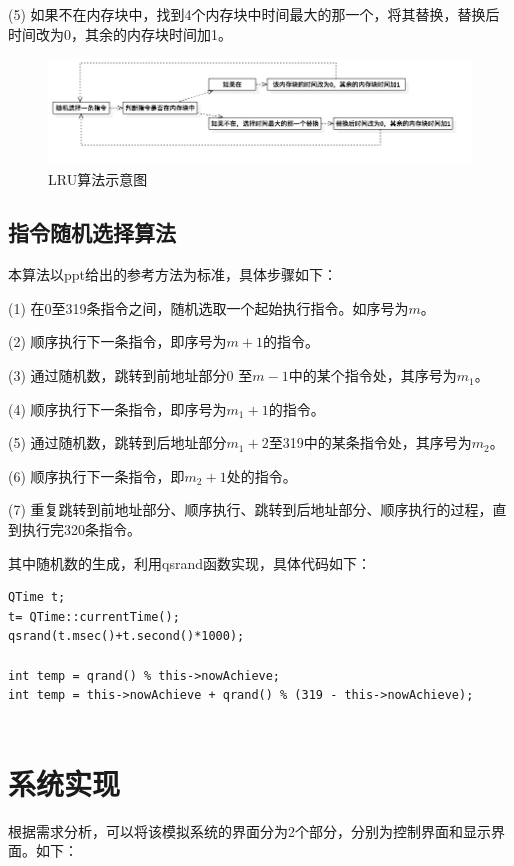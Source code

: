 \documentclass{article}
\begin{document}
\begin{CJK}{UTF8}{gbsn}
(5) 如果不在内存块中，找到4个内存块中时间最大的那一个，将其替换，替换后时间改为0，其余的内存块时间加1。

\begin{figure}[!h]
\centering
\includegraphics[width=1.1\textwidth]{2.jpg}
\caption{LRU算法示意图}
\end{figure}

\subsection{指令随机选择算法}
本算法以ppt给出的参考方法为标准，具体步骤如下：

(1) 在0至319条指令之间，随机选取一个起始执行指令。如序号为$m$。

(2) 顺序执行下一条指令，即序号为$m+1$的指令。

(3) 通过随机数，跳转到前地址部分0 至$m-1$中的某个指令处，其序号为$m_{1}$。

(4) 顺序执行下一条指令，即序号为$m_{1}+1$的指令。

(5) 通过随机数，跳转到后地址部分$m_{1}+2$至319中的某条指令处，其序号为$m_{2}$。

(6) 顺序执行下一条指令，即$m_{2}+1$处的指令。

(7) 重复跳转到前地址部分、顺序执行、跳转到后地址部分、顺序执行的过程，直到执行完320条指令。

其中随机数的生成，利用qsrand函数实现，具体代码如下：

\begin{lstlisting}
QTime t;
t= QTime::currentTime();
qsrand(t.msec()+t.second()*1000);

int temp = qrand() % this->nowAchieve;
int temp = this->nowAchieve + qrand() % (319 - this->nowAchieve);
	
\end{lstlisting}
\clearpage

\section{系统实现}
根据需求分析，可以将该模拟系统的界面分为2个部分，分别为控制界面和显示界面。如下：


\end{CJK}
\end{document}
